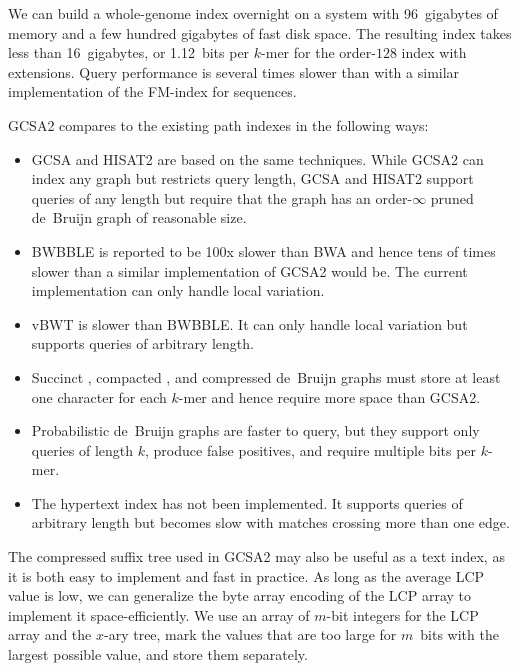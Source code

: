 \documentclass[a4paper,UKenglish]{lipics-v2016}
\newcommand{\kmer}[1]{$#1$\nobreakdash-mer}
\newcommand{\orderk}[1]{order\nobreakdash-$#1$}
\begin{document}
We can build a whole-genome index overnight on a system with 96~gigabytes of memory and a few hundred gigabytes of fast disk space. The resulting index takes less than 16~gigabytes, or 1.12~bits per \kmer{k} for the \orderk{128} index with extensions. Query performance is several times slower than with a similar implementation of the FM\nobreakdash-index for sequences.

GCSA2 compares to the existing path indexes in the following ways:
\begin{itemize}

\item GCSA \cite{Siren2014} and HISAT2 \cite{Kim2015-2016} are based on the same techniques. While GCSA2 can index any graph but restricts query length, GCSA and HISAT2 support queries of any length but require that the graph has an \orderk{\infty} pruned de~Bruijn graph of reasonable size.

\item BWBBLE \cite{Huang2013} is reported to be 100x slower than BWA \cite{Li2009} and hence tens of times slower than a similar implementation of GCSA2 would be. The current implementation can only handle local variation.

\item vBWT \cite{Maciuca2016} is slower than BWBBLE. It can only handle local variation but supports queries of arbitrary length.

\item Succinct \cite{Bowe2012}, compacted \cite{Cazaux2014}, and compressed \cite{Marcus2014} de~Bruijn graphs must store at least one character for each \kmer{k} and hence require more space than GCSA2.

\item Probabilistic de~Bruijn graphs \cite{Pell2012} are faster to query, but they support only queries of length $k$, produce false positives, and require multiple bits per \kmer{k}.

\item The hypertext index \cite{Thachuk2013} has not been implemented. It supports queries of arbitrary length but becomes slow with matches crossing more than one edge.

\end{itemize}

The compressed suffix tree used in GCSA2 may also be useful as a text index, as it is both easy to implement and fast in practice. As long as the average LCP value is low, we can generalize the byte array encoding of the LCP array \cite{Abouelhoda2004} to implement it space-efficiently. We use an array of $m$\nobreakdash-bit integers for the LCP array and the $x$\nobreakdash-ary tree, mark the values that are too large for $m$~bits with the largest possible value, and store them separately.
\end{document}
